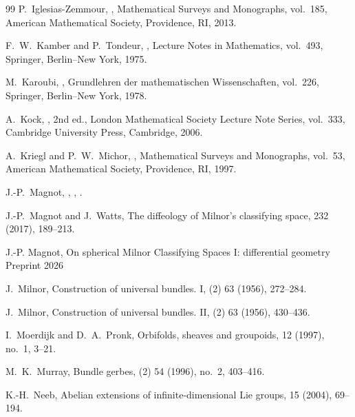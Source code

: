 \documentclass[11pt]{amsart}
\begin{document}
\begin{thebibliography}{99}
P.~Iglesias-Zemmour,
,
\newblock Mathematical Surveys and Monographs, vol.~185,
\newblock American Mathematical Society, Providence, RI, 2013.

F.~W.~Kamber and P.~Tondeur,
,
\newblock Lecture Notes in Mathematics, vol.~493,
\newblock Springer, Berlin--New York, 1975.

M.~Karoubi,
,
\newblock Grundlehren der mathematischen Wissenschaften, vol.~226,
\newblock Springer, Berlin--New York, 1978.

A.~Kock,
,
\newblock 2nd ed.,
\newblock London Mathematical Society Lecture Note Series, vol.~333,
\newblock Cambridge University Press, Cambridge, 2006.

A.~Kriegl and P.~W.~Michor,
,
\newblock Mathematical Surveys and Monographs, vol.~53,
\newblock American Mathematical Society, Providence, RI, 1997.

J.-P.~Magnot,
,
,
.

J.-P.~Magnot and J.~Watts,
\newblock The diffeology of Milnor's classifying space,
 232 (2017), 189--213.

J.-P. Magnot,
\newblock On spherical Milnor Classifying Spaces I:
differential geometry
\newblock Preprint 2026

J.~Milnor,
\newblock Construction of universal bundles. I,
 (2) 63 (1956), 272--284.

J.~Milnor,
\newblock Construction of universal bundles. II,
 (2) 63 (1956), 430--436.

I.~Moerdijk and D.~A.~Pronk,
\newblock Orbifolds, sheaves and groupoids,
 12 (1997), no.~1, 3--21.

M.~K.~Murray,
\newblock Bundle gerbes,
 (2) 54 (1996), no.~2, 403--416.

K.-H.~Neeb,
\newblock Abelian extensions of infinite-dimensional Lie groups,
 15 (2004), 69--194.


\end{thebibliography}
\end{document}
